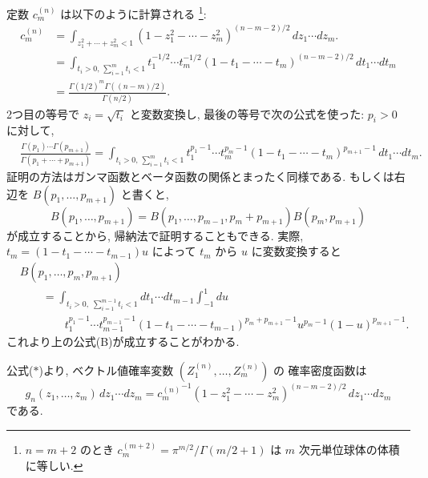 \documentclass[12pt,twoside]{jarticle}
\theoremstyle{jplain}
\theoremstyle{jplain}
\theoremstyle{jplain}
\numberwithin{theorem}{section}
\numberwithin{equation}{section}
\numberwithin{figure}{section}
\numberwithin{table}{section}
\begin{document}
定数 $c^{(n)}_{m}$ は以下のように計算される%
\footnote{$n=m+2$ のとき $c_m^{(m+2)}=\pi^{m/2}/\Gamma(m/2+1)$
は $m$ 次元単位球体の体積に等しい.}:
\begin{align*}
c^{(n)}_{m}
&=
\int_{z_1^2+\cdots+z_m^2<1}
(1-z_1^2-\cdots-z_m^2)^{(n-m-2)/2}\,dz_1\cdots dz_m.
\\ &
= \int_{t_i>0,\, \sum_{i=1}^m t_i<1}
t_1^{-1/2}\cdots t_m^{-1/2}
(1-t_1-\cdots-t_m)^{(n-m-2)/2}\,dt_1\cdots dt_m
\\ &
= \frac{\Gamma(1/2)^m\Gamma((n-m)/2)}{\Gamma(n/2)}.
\end{align*}
2つ目の等号で $z_i=\sqrt{t_i}$ と変数変換し,
最後の等号で次の公式を使った: $p_i>0$ に対して,
\begin{align*}
&
\frac{\Gamma(p_1)\cdots\Gamma(p_{m+1})}{\Gamma(p_1+\cdots+p_{m+1})}
=
\int_{t_i>0,\, \sum_{i=1}^m t_i<1}
t_1^{p_1-1}\cdots t_m^{p_m-1}
(1-t_1-\cdots-t_m)^{p_{m+1}-1}\,dt_1\cdots dt_m.
\end{align*}
証明の方法はガンマ函数とベータ函数の関係とまったく同様である.
もしくは右辺を $B(p_1,\ldots,p_{m+1})$ と書くと,
\[
B(p_1,\ldots,p_{m+1})
=B(p_1,\ldots,p_{m-1},p_m+p_{m+1})B(p_m,p_{m+1})
\tag{B}
\]
が成立することから, 帰納法で証明することもできる.
実際, $t_m=(1-t_1-\cdots-t_{m-1})u$ によって $t_m$ から $u$ に変数変換すると
\begin{align*}
&
B(p_1,\ldots,p_m,p_{m+1})
\\ & \qquad
=
\int_{t_i>0,\;\sum_{i=1}^{m-1}t_i<1}
dt_1\cdots dt_{m-1}
\int_{-1}^1 du
\\ & \qquad\qquad
t_1^{p_1-1}\cdots t_{m-1}^{p_{m-1}-1}
(1-t_1-\cdots-t_{m-1})^{p_m+p_{m+1}-1}
u^{p_m-1}(1-u)^{p_{m+1}-1}.
\end{align*}
これより上の公式(B)が成立することがわかる.


公式($*$)より, ベクトル値確率変数 $(Z^{(n)}_1,\ldots,Z^{(n)}_m)$ の
確率密度函数は
\[
g_n(z_1,\ldots,z_m)\,dz_1\cdots dz_m
=
{c^{(n)}_{m}}^{-1}(1-z_1^2-\cdots-z_m^2)^{(n-m-2)/2}\,dz_1\cdots dz_m
\]
である.
\end{document}
